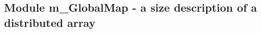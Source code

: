  
\parskip        0pt
\parindent      0pt
\baselineskip  11pt
 
\def\bv{\begin{verbatim}}
\def\ev{\end{verbatim}}
\def\be{\begin{equation}}
\def\ee{\end{equation}}
\def\bea{\begin{eqnarray}}
\def\eea{\end{eqnarray}}
\def\bi{\begin{itemize}}
\def\ei{\end{itemize}}
\def\bn{\begin{enumerate}}
\def\en{\end{enumerate}}
\def\bd{\begin{description}}
\def\ed{\end{description}}
\def\({\left (}
\def\){\right )}
\def\[{\left [}
\def\]{\right ]}
\def\<{\left  \langle}
\def\>{\right \rangle}
\def\cI{{\cal I}}
\def\diag{\mathop{\rm diag}}
\def\tr{\mathop{\rm tr}}
 

 \subsection{Module m\_GlobalMap - a size description of a distributed array}


 
 

